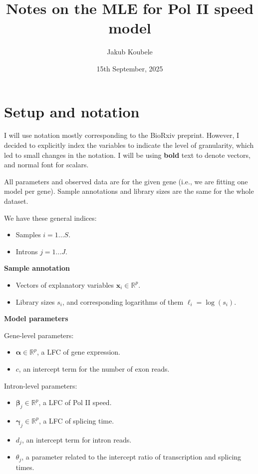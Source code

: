 \documentclass{article}
\title{Notes on the MLE for Pol II speed model}
\author{Jakub Koubele}
\date{15th September, 2025}
\begin{document}
	
	
	\maketitle
	
	\section{Setup and notation}
	I will use notation mostly corresponding to the BioRxiv preprint. However, I decided to explicitly index the variables to indicate the level of granularity, which led to small changes in the notation. I will be using \textbf{bold} text to denote vectors, and normal font for scalars.
	
	All parameters and observed data are for the given gene (i.e., we are fitting one model per gene). Sample annotations and library sizes are the same for the whole dataset.
	
	We have these general indices:
	
	\begin{itemize}
		\item Samples $i=1...S$.
		\item Introns $j=1...J$.
	\end{itemize}
	
	\textbf{Sample annotation}
	\begin{itemize}
		\item Vectors of explanatory variables $\mathbf{x}_i \in \mathbb{R}^p$.
		\item Library sizes $s_i$, and corresponding logarithms of them $\ell_i = \log(s_i)$.		
	\end{itemize}
	
	\textbf{Model parameters}
	
	Gene-level parameters:
	\begin{itemize}
		\item $\boldsymbol{\alpha} \in \mathbb{R}^p$, a LFC of gene expression.
		\item $c$, an intercept term for the number of exon reads.		
	\end{itemize}
	
	Intron-level parameters:
	\begin{itemize}
		\item $\boldsymbol{\beta}_j \in \mathbb{R}^p$, a LFC of Pol II speed.
		\item $\boldsymbol{\gamma}_j \in \mathbb{R}^p$, a LFC of splicing time.
		\item $d_j$, an intercept term for intron reads.
		\item $\theta_j$, a parameter related to the intercept ratio of transcription and splicing times.			
	\end{itemize}
	
\end{document}
